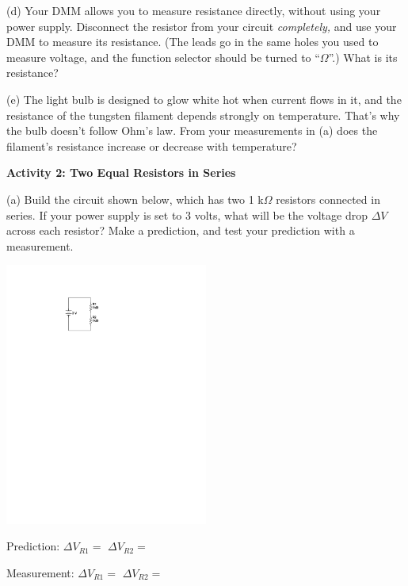 (d) Your DMM allows you to measure resistance directly, without using your power supply.  Disconnect the resistor from your circuit \textit{completely,} and use your DMM to measure its resistance.  (The leads go in the same holes you used to measure voltage, and the function selector should be turned to ``$\Omega$''.)  What is its resistance?
\answerspace{0.5 in}

(e) The light bulb is designed to glow white hot when current flows in it, and the resistance of the tungsten filament depends strongly on temperature.  That's why the bulb doesn't follow Ohm's law.  From your measurements in (a) does the filament's resistance increase or decrease with temperature?
\answerspace{0.6 in}

\textbf{Activity 2: Two Equal Resistors in Series} \par
\nopagebreak
(a) Build the circuit shown below, which has two 1 k$\Omega$ resistors connected in series.  If your power supply is set to 3 volts, what will be the voltage drop $\Delta V$ across each resistor?  Make a prediction, and test your prediction with a measurement.

\begin{minipage}{0.4\textwidth} 
\hspace{0.5in}\includegraphics[width=0.5\textwidth]{electric_circuits2/circ_diag2_bw.pdf}
\end{minipage}
\begin{minipage}{0.59\textwidth} 
\vspace{0.2 in}
Prediction: \hspace{0.4 in} $\Delta V_{R1} =$ \hspace{0.8 in} $\Delta V_{R2}=$
\vspace{0.2 in}

Measurement: \hspace{0.2 in} $\Delta V_{R1} =$ \hspace{0.8 in} $\Delta V_{R2}=$ 
\answerspace{0.2 in}
\end{minipage}

